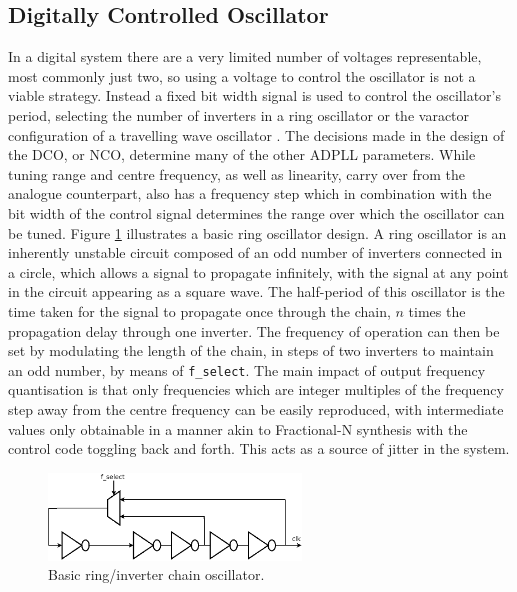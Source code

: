 \subsection{Digitally Controlled Oscillator}
In a digital system there are a very limited number of voltages representable, most commonly just two, so using a voltage to control the oscillator is not a viable strategy. Instead a fixed bit width signal is used to control the oscillator's period, selecting the number of inverters in a ring oscillator or the varactor configuration of a travelling wave oscillator \cite{chen2011rotary}. The decisions made in the design of the \ac{DCO}, or \ac{NCO}, determine many of the other \ac{ADPLL} parameters. While tuning range and centre frequency, as well as linearity, carry over from the analogue counterpart,  also has a frequency step which in combination with the bit width of the control signal determines the range over which the oscillator can be tuned. Figure \ref{fig:my_ring} illustrates a basic ring oscillator design. A ring oscillator is an inherently unstable circuit composed of an odd number of inverters connected in a circle, which allows a signal to propagate infinitely, with the signal at any point in the circuit appearing as a square wave. The half-period of this oscillator is the time taken for the signal to propagate once through the chain, $n$ times the propagation delay through one inverter. The frequency of operation can then be set by modulating the length of the chain, in steps of two inverters to maintain an odd number, by means of \texttt{f\_select}. The main impact of output frequency quantisation is that only frequencies which are integer multiples of the frequency step away from the centre frequency can be easily reproduced, with intermediate values only obtainable in a manner akin to Fractional-N synthesis with the control code toggling back and forth. This acts as a source of jitter in the system.
\begin{figure}[h]
	\centering
	\includegraphics[width=0.6\textwidth]{../inverter_chain}
	\caption[Basic Ring/Inverter Chain Oscillator]{Basic ring/inverter chain oscillator.}
	\label{fig:my_ring}
\end{figure}

